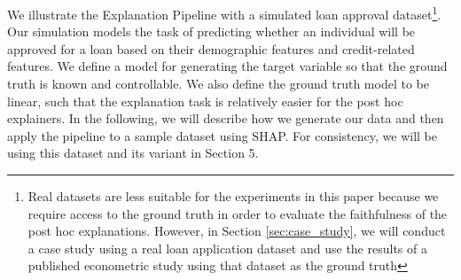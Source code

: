 \documentclass[12pt]{article}  %
\begin{document}
    We illustrate the Explanation Pipeline with a simulated loan approval dataset\footnote{Real datasets are less suitable for the experiments in this paper because we require access to the ground truth in order to evaluate the faithfulness of the post hoc explanations. However, in Section \ref{sec:case_study}, we will conduct a case study using a real loan application dataset and use the results of a published econometric study using that dataset as the ground truth}. Our simulation models the task of predicting whether an individual will be approved for a loan based on their demographic features and credit-related features. We define a model for generating the target variable so that the ground truth is known and controllable. We also define the ground truth model to be linear, such that the explanation task is relatively easier for the post hoc explainers. %
    In the following, we will describe how we generate our data and then apply the pipeline to a sample dataset using SHAP. For consistency, we will be using this dataset and its variant in Section 5. %
\end{document}
